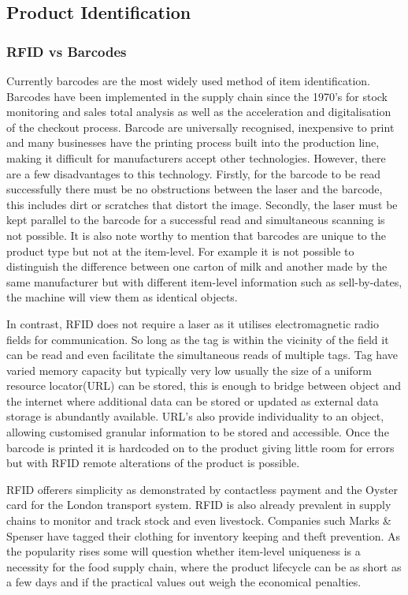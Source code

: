 \documentclass[a4paper, 11pt]{article}
\begin{document}
\subsection{Product Identification}

\subsubsection{RFID vs Barcodes}Currently barcodes are the most widely used method of item identification. Barcodes have been implemented in the supply chain since the 1970's for stock monitoring and sales total analysis as well as the acceleration and digitalisation of the checkout process. Barcode are universally recognised, inexpensive to print and many businesses have the printing process built into the production line, making it difficult for manufacturers accept other technologies. However, there are a few disadvantages to this technology. Firstly, for the barcode to be read successfully there must be no obstructions between the laser and the barcode, this includes dirt or scratches that distort the image. Secondly, the laser must be kept parallel to the barcode for a successful read and simultaneous scanning is not possible. It is also note worthy to mention that barcodes are unique to the product type but not at the item-level. For example it is not possible to distinguish the difference between one carton of milk and another made by the same manufacturer but with different item-level information such as sell-by-dates, the machine will view them as identical objects.

In contrast, RFID does not require a laser as it utilises electromagnetic radio fields for communication. So long as the tag is within the vicinity of the field it can be read and even facilitate the simultaneous reads of multiple tags. Tag have varied memory capacity but typically very low usually the size of a uniform resource locator(URL) can be stored, this is enough to bridge between object and the internet where additional data can be stored or updated as external data storage is abundantly available. URL's also provide individuality to an object, allowing customised granular information to be stored and accessible. Once the barcode is printed it is hardcoded on to the product giving little room for errors but with RFID remote alterations of the product is possible.\cite{georgeR}

RFID offerers simplicity as demonstrated by contactless payment and the Oyster card for the London transport system. RFID is also already prevalent in supply chains to monitor and track stock and even livestock. Companies such Marks \& Spenser have tagged their clothing for inventory keeping and theft prevention.\cite{retailRFID} As the popularity rises some will question whether item-level uniqueness is a necessity for the food supply chain, where the product lifecycle can be as short as a few days and if the practical values out weigh the economical penalties. 
\end{document}
